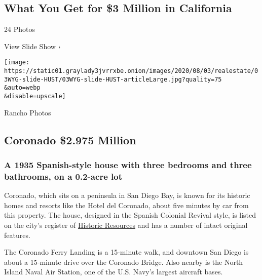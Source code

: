 \href{https://www.nytimes3xbfgragh.onion/slideshow/2020/08/03/realestate/what-you-get-for-3-million-in-california.html}{}

\hypertarget{what-you-get-for-3-million-in-california}{%
\subsection{What You Get for \$3 Million in
California}\label{what-you-get-for-3-million-in-california}}

24 Photos

View Slide Show ›

\texttt{[image: https://static01.graylady3jvrrxbe.onion/images/2020/08/03/realestate/03WYG-slide-HUST/03WYG-slide-HUST-articleLarge.jpg?quality=75\\\&auto=webp\\\&disable=upscale]}

Rancho Photos

\hypertarget{coronado--2975-million}{%
\subsection{Coronado \textbar{} \$2.975
Million}\label{coronado--2975-million}}

\hypertarget{a-1935-spanish-style-house-with-three-bedrooms-and-three-bathrooms-on-a-02-acre-lot}{%
\subsubsection{\texorpdfstring{\textbf{A 1935 Spanish-style house with
three bedrooms and three bathrooms, on a 0.2-acre
lot}}{A 1935 Spanish-style house with three bedrooms and three bathrooms, on a 0.2-acre lot}}\label{a-1935-spanish-style-house-with-three-bedrooms-and-three-bathrooms-on-a-02-acre-lot}}

Coronado, which sits on a peninsula in San Diego Bay, is known for its
historic homes and resorts like the Hotel del Coronado, about five
minutes by car from this property. The house, designed in the Spanish
Colonial Revival style, is listed on the city's register of
\href{https://www.coronado.ca.us/UserFiles/Servers/Server_746006/File/government/departments/comm\%20dev/Coronado\%20Register\%20tri-fold_May\%202016.pdf}{Historic
Resources} and has a number of intact original features.

The Coronado Ferry Landing is a 15-minute walk, and downtown San Diego
is about a 15-minute drive over the Coronado Bridge. Also nearby is the
North Island Naval Air Station, one of the U.S. Navy's largest aircraft
bases.

